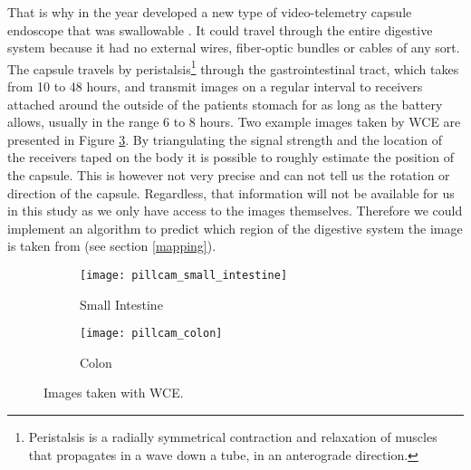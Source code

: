\documentclass[thesis.tex]{subfiles}
\begin{document}

That is why in the year \citeyear{WirelessCapsule00} \citeauthor*{WirelessCapsule00} developed a new type of video-telemetry capsule endoscope that was swallowable \cite{WirelessCapsule00}. It could travel through the entire digestive system because it had no external wires, fiber-optic bundles or cables of any sort. The capsule travels by peristalsis\footnote{Peristalsis is a radially symmetrical contraction and relaxation of muscles that propagates in a wave down a tube, in an anterograde direction.} through the gastrointestinal tract, which takes from 10 to 48 hours, and transmit images on a regular interval to receivers attached around the outside of the patients stomach for as long as the battery allows, usually in the range 6 to 8 hours. Two example images taken by WCE are presented in Figure \ref{fig:pillcam_examples}. By triangulating the signal strength and the location of the receivers taped on the body it is possible to roughly estimate the position of the capsule. This is however not very precise and can not tell us the rotation or direction of the capsule. Regardless, that information will not be available for us in this study as we only have access to the images themselves. Therefore we could implement an algorithm to predict which region of the digestive system the image is taken from (see section \ref{mapping}).

\begin{figure} %
  \centering
  \begin{subfigure}[b]{0.4\linewidth}%
    \centering
    \texttt{[image: pillcam\_small\_intestine]}%
    \caption{Small Intestine}%
    \label{fig:pillcam_small_intestine}%
  \end{subfigure}%
  \quad
  \begin{subfigure}[b]{0.4\linewidth}%
    \centering
    \texttt{[image: pillcam\_colon]}%
    \caption{Colon}%
    \label{fig:pillcam_colon}%
  \end{subfigure}%
  \caption[Images taken with WCE]{Images taken with WCE\footnotemark.}%
  \label{fig:pillcam_examples}%
\end{figure}%

\end{document}
